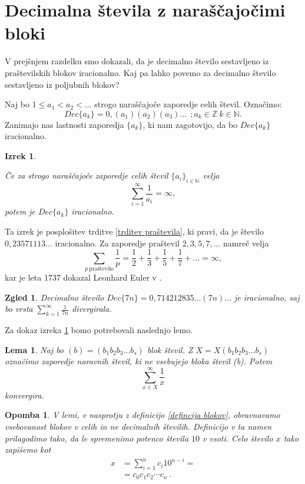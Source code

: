 \documentclass[a4paper,12pt]{article}
\def\N{\mathbb{N}} %
\def\Z{\mathbb{Z}} %
\newtheorem{izrek}{Izrek}
\newtheorem{lema}{Lema}
\newtheorem{opomba}{Opomba}
\newtheorem{zgled}{Zgled}
\begin{document}

\section{Decimalna števila z naraščajočimi bloki}

V prejšnjem razdelku smo dokazali, da je decimalno število sestavljeno iz praštevilskih
blokov iracionalno. Kaj pa lahko povemo za decimalno število sestavljeno iz poljubnih blokov?

Naj bo $1 \leq a_1 < a_2 < \dots $ strogo naraščajoče zaporedje celih števil. 
Označimo: \[Dec\{a_k\} = 0,(a_1)(a_2)(a_3)... \  \ ;  a_k \in \Z \ k \in \N. \]
Zanimajo nas lastnosti zaporedja $\{a_k\}$, ki nam zagotovijo, da bo $Dec\{a_k\}$ iracionalno.

\begin{izrek}\label{irac1}
    
    Če za strogo naraščajoče zaporedje celih števil $\{a_i\}_{i \in \N}$ velja 
    \[ \sum_{i=1}^{\infty} \frac{1}{a_i} = \infty ,\]
    potem je $Dec\{a_k\}$ iracionalno.
\end{izrek}

Ta izrek je posplošitev trditve \ref{trditev praštevila}, ki pravi, da je število $0,23571113 \dots$
iracionalno. Za zaporedje praštevil $2, 3, 5, 7, \dots$ namreč velja
\[
    \sum_{p \ \text{praštevilo}}\frac{1}{p} = \frac{1}{2} + \frac{1}{3} + \frac{1}{5} + \frac{1}{7} + \dots = \infty ,\]
kar je leta 1737 dokazal Leonhard Euler v \cite{Eul}.

\begin{zgled}
    Decimalno število $Dec\{7n\} = 0,714212835\dots (7n) \dots$ je iracionalno, saj
    bo vrsta $\sum_{k=1}^{\infty}\frac{1}{7n} $ divergirala.
\end{zgled}

Za dokaz izreka \ref{irac1} bomo potrebovali naslednjo lemo.

\begin{lema}
    Naj bo $(b) = (b_1b_2b_3 \dots b_s)$ blok števil. Z $X = X(b_1b_2b_3 \dots b_s)$ označimo
    zaporedje naravnih števil, ki ne vsebujejo bloka števil (b). Potem 
    \[ \sum_{x \in X}^{\infty} \frac{1}{x}\] konvergira.
\end{lema}

\begin{opomba}
    \label{lema bloki}
    V lemi, v nasprotju z definicijo \ref{defincija blokov}, obravnavamo vsebovanost blokov v celih
    in ne decimalnih številih. Definicijo v ta namen prilagodimo tako, da le spremenimo potenco števila
    $10$ v vsoti. Celo število $x$ tako zapišemo kot 
    \[ 
        \begin{split}
            x & = \sum^n_{i=1} c_i 10^{n-i} = \\
            & = c_0c_1c_2 \cdots c_n \ .
        \end{split} \]
\end{opomba}
\end{document}
